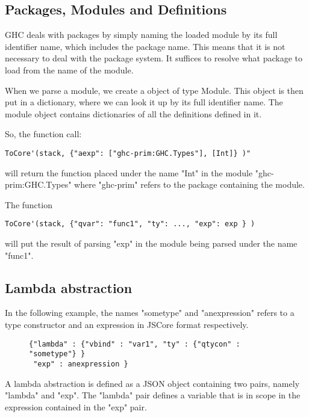 \subsection*{Packages, Modules and Definitions}

GHC deals with packages by simply naming the loaded module by its full identifier
name, which includes the package name. This means that it is not necessary to deal
with the package system. It suffices to resolve what package to load from the name
of the module.

When we parse a module, we create a object of type Module. This object is
then put in a dictionary, where we can look it up by its full identifier name.
The module object contains dictionaries of all the definitions defined in it.

So, the function call:
\lstset{ %
language=Haskell,
}
\begin{lstlisting}
ToCore'(stack, {"aexp": ["ghc-prim:GHC.Types"], [Int]} )" 
\end{lstlisting}

will return the function placed under the name "Int" in the module "ghc-prim:GHC.Types" 
where "ghc-prim" refers to the package containing the module. 

The function 
\lstset{ %
language=Haskell,
}
\begin{lstlisting}
ToCore'(stack, {"qvar": "func1", "ty": ..., "exp": exp } )
\end{lstlisting}
will
put the result of parsing "exp" in the module being parsed under the name "func1".

\subsection*{Lambda abstraction}

In the following example, the names "sometype" and "anexpression" refers to a 
type constructor and an expression in JSCore format respectively.

\begin{figure}[H]
\lstset{ %
language=Haskell,
}
\begin{lstlisting}
{"lambda" : {"vbind" : "var1", "ty" : {"qtycon" : "sometype"} }
 "exp" : anexpression }
\end{lstlisting}
\end{figure}

A lambda abstraction is defined as a JSON object containing two pairs, namely 
"lambda" and "exp". The "lambda" pair defines a variable that is in scope in the
expression contained in the "exp" pair.

